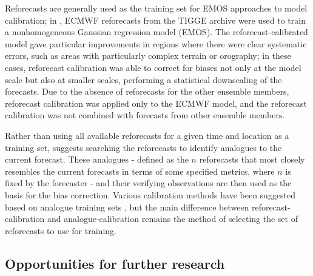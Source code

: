 \documentclass[10pt,fleqn]{article}
\begin{document}
Reforecasts are generally used as the training set for EMOS approaches to model calibration; in \cite{Hagedorn2012}, ECMWF reforecasts from the TIGGE archive were used to train a nonhomogeneous Gaussian regression model (EMOS). The reforecast-calibrated model gave particular improvements in regions where there were clear systematic errors, such as areas with particularly complex terrain or orography; in these cases, reforecast calibration was able to correct for biases not only at the model scale but also at smaller scales, performing a statistical downscaling of the forecasts. Due to the absence of reforecasts for the other ensemble members, reforecast calibration was applied only to the ECMWF model, and the reforecast calibration was not combined with forecasts from other ensemble members. 



Rather than using all available reforecasts for a given time and location as a training set, \cite{Hamill2006} suggests searching the reforecasts to identify analogues to the current forecast. These analogues - defined as the $n$ reforecasts that most closely resembles the current forecasts in terms of some specified metrics, where $n$ is fixed by the forecaster - and their verifying observations are then used as the basis for the bias correction. Various calibration methods have been suggested based on analogue training sets \cite{DelleMonache2013, Djalalova2015}, but the main difference between reforecast-calibration and analogue-calibration remains the method of selecting the set of reforecasts to use for training. 




\subsection*{Opportunities for further research}
\end{document}
